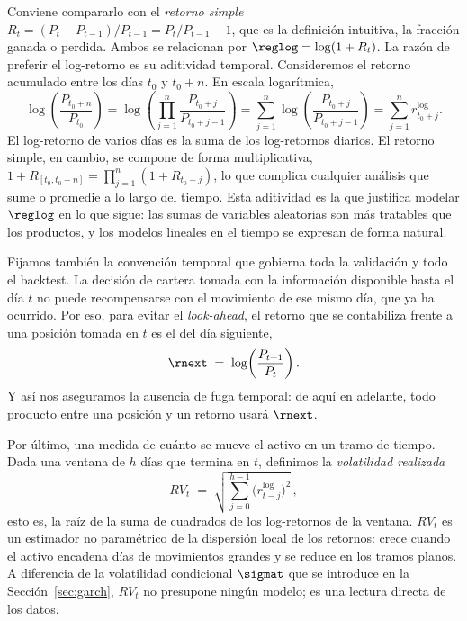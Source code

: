 Conviene compararlo con el \emph{retorno simple} $R_t = (P_t - P_{t-1})/P_{t-1} = P_t/P_{t-1} - 1$, que es la definición intuitiva, la fracción ganada o perdida. Ambos se relacionan por $\reglog = \log(1 + R_t)$. La razón de preferir el log-retorno es su aditividad temporal. Consideremos el retorno acumulado entre los días $t_0$ y $t_0 + n$. En escala logarítmica,
\[
\log\!\left(\frac{P_{t_0+n}}{P_{t_0}}\right)
= \log\!\left(\prod_{j=1}^{n} \frac{P_{t_0+j}}{P_{t_0+j-1}}\right)
= \sum_{j=1}^{n} \log\!\left(\frac{P_{t_0+j}}{P_{t_0+j-1}}\right)
= \sum_{j=1}^{n} r^{\log}_{t_0+j}.
\]
El log-retorno de varios días es la suma de los log-retornos diarios. El retorno simple, en cambio, se compone de forma multiplicativa, $1 + R_{[t_0, t_0+n]} = \prod_{j=1}^{n}(1 + R_{t_0+j})$, lo que complica cualquier análisis que sume o promedie a lo largo del tiempo. Esta aditividad es la que justifica modelar $\reglog$ en lo que sigue: las sumas de variables aleatorias son más tratables que los productos, y los modelos lineales en el tiempo se expresan de forma natural.

Fijamos también la convención temporal que gobierna toda la validación y todo el backtest. La decisión de cartera tomada con la información disponible hasta el día $t$ no puede recompensarse con el movimiento de ese mismo día, que ya ha ocurrido. Por eso, para evitar el \emph{look-ahead}, el retorno que se contabiliza frente a una posición tomada en $t$ es el del día siguiente,
\[
\rnext \;=\; \log\!\left(\frac{P_{t+1}}{P_t}\right).
\]
Y así nos aseguramos la ausencia de fuga temporal: de aquí en adelante, todo producto entre una posición y un retorno usará $\rnext$.


Por último, una medida de cuánto se mueve el activo en un tramo de tiempo. Dada una ventana de $h$ días que termina en $t$, definimos la \emph{volatilidad realizada}
\[
RV_t \;=\; \sqrt{\sum_{j=0}^{h-1} \big(r^{\log}_{t-j}\big)^2}\,,
\]
esto es, la raíz de la suma de cuadrados de los log-retornos de la ventana. $RV_t$ es un estimador no paramétrico de la dispersión local de los retornos: crece cuando el activo encadena días de movimientos grandes y se reduce en los tramos planos. A diferencia de la volatilidad condicional $\sigmat$ que se introduce en la Sección~\ref{sec:garch}, $RV_t$ no presupone ningún modelo; es una lectura directa de los datos.


